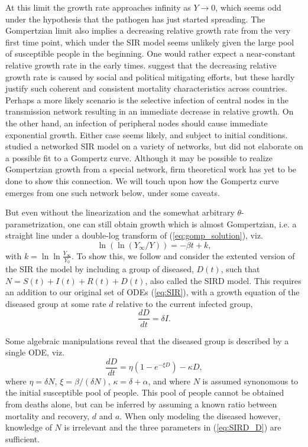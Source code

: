 \documentclass[review]{elsarticle}
\begin{document}
 At this limit the growth rate approaches infinity as $Y \rightarrow 0$, which seems odd under the hypothesis that the pathogen has just started spreading. The Gompertzian limit also implies a decreasing relative growth rate from the very first time point, which under the SIR model seems unlikely given the large pool of susceptible people in the beginning. One would rather expect a near-constant relative growth rate in the early times. \citet{Rypdal2020} suggest that the decreasing relative growth rate is caused by social and political mitigating efforts, but these hardly justify such coherent and consistent mortality characteristics across countries. Perhaps a more likely scenario is the selective infection of central nodes in the transmission network resulting in an immediate decrease in relative growth. On the other hand, an infection of peripheral nodes should cause immediate exponential growth. Either case seems likely, and subject to initial conditions. \citet{herrmann2020covid} studied a networked SIR model on a variety of networks, but did not elaborate on a possible fit to a Gompertz curve. Although it may be possible to realize Gompertzian growth from a special network, firm theoretical work has yet to be done to show this connection. We will touch upon how the Gompertz curve emerges from one such network below, under some caveats.

But even without the linearization and the somewhat arbitrary $\theta$-parametrization, one can still obtain growth which is almost Gompertzian, i.e. a straight line under a double-log transform of (\ref{eq:gomp_solution}), viz.
\begin{equation}
\label{eq:GOMP_D}
\ln{(\ln{(Y_{\infty}/Y)})} = -\beta t + k,
\end{equation}
with $k=\ln{\ln{\frac{Y_{\infty}}{Y_{0}}}}$. To show this, we follow \citet{carletti2020covid} and consider the extented version of the SIR the model by including a group of diseased, $D(t)$, such that $N = S(t) + I(t) + R(t) + D(t)$, also called the SIRD model. This requires an addition to our original set of ODEs (\ref{eq:SIR}), with a growth equation of the diseased group at some rate $d$ relative to the current infected group,
\begin{equation}
\frac{dD}{dt} = \delta I.
\end{equation}

Some algebraic manipulations reveal that the diseased group is described by a single ODE, viz.
\begin{equation}
\label{eq:SIRD_D}
\frac{dD}{dt} = \eta( 1 - e^{-\xi D}) - \kappa D,
\end{equation}
where $\eta = \delta N$, $\xi = \beta/(\delta N)$, $\kappa = \delta + \alpha$, and where $N$ is assumed synonomous to the initial susceptible pool of people. This pool of people cannot be obtained from deaths alone, but can be inferred by assuming a known ratio between mortality and recovery, $d$ and $a$. 
When only modeling the diseased however, knowledge of $N$ is irrelevant and the three parameters in (\ref{eq:SIRD_D}) are sufficient.
\end{document}
